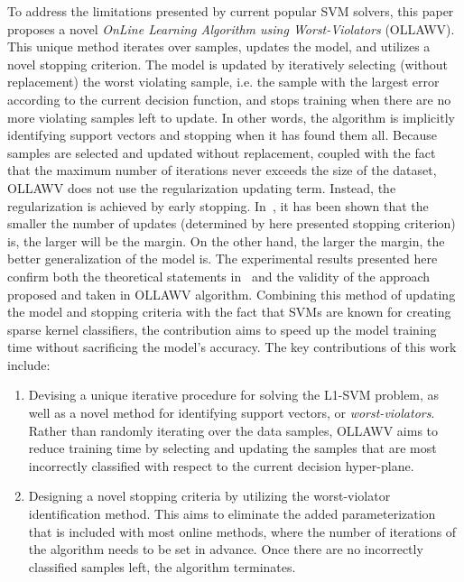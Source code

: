 \documentclass[reqno]{vcuthesis}
\newcommand{\iitem}{\item[-]}
\numberwithin{equation}{chapter}
\begin{document}
To address the limitations presented by current popular SVM solvers, this paper proposes a novel \textit{OnLine Learning Algorithm using Worst-Violators} (OLLAWV). This unique method iterates over samples, updates the model, and utilizes a novel stopping criterion. The model is updated by iteratively selecting (without replacement) the worst violating sample, i.e. the sample with the largest error according to the current decision function,  and stops training when there are no more violating samples left to update. In other words, the algorithm is implicitly identifying support vectors and stopping when it has found them all. Because samples are selected and updated without replacement, coupled with the fact that the maximum number of iterations never exceeds the size of the dataset, OLLAWV does not use the regularization updating term. Instead, the regularization is achieved by early stopping. In~\cite{collobert2004links}, it has been shown that the smaller the number of updates (determined by here presented stopping criterion) is, the larger will be the margin. On the other hand, the larger the margin, the better generalization of the model is. The experimental results presented here confirm both the theoretical statements in~\cite{collobert2004links} and the validity of the approach proposed and taken in OLLAWV algorithm. Combining this method of updating the model and stopping criteria with the fact that SVMs are known for creating sparse kernel classifiers, the contribution aims to speed up the model training time without sacrificing the model's accuracy. The key contributions of this work include:
\begin{enumerate}
\iitem Devising a unique iterative procedure for solving the L1-SVM problem, as well as a novel method for identifying support vectors, or \textit{worst-violators}. Rather than randomly iterating over the data samples, OLLAWV aims to reduce training time by selecting and updating the samples that are most incorrectly classified with respect to the current decision hyper-plane.

\iitem Designing a novel stopping criteria by utilizing the worst-violator identification method. This aims to eliminate the added parameterization that is included with most online methods, where the number of iterations of the algorithm needs to be set in advance. Once there are no incorrectly classified samples left, the algorithm terminates.
\end{enumerate}
\end{document}
